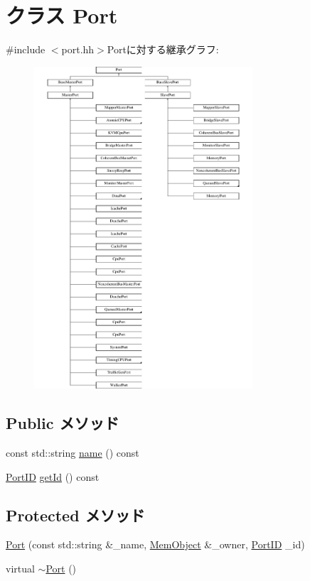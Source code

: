 \hypertarget{classPort}{
\section{クラス Port}
\label{classPort}
}


{\ttfamily \#include $<$port.hh$>$}Portに対する継承グラフ:\begin{figure}[H]
\begin{center}
\leavevmode
\includegraphics[height=12cm]{classPort}
\end{center}
\end{figure}
\subsection*{Public メソッド}
\begin{DoxyCompactItemize}
\item 
const std::string \hyperlink{classPort_a6490f765a824ced1cc94979609fe7e07}{name} () const 
\item 
\hyperlink{base_2types_8hh_acef4d7d41cb21fdc252e20c04cd7bb8e}{PortID} \hyperlink{classPort_ad95169ead4fa2bd3241b2bbb1bc7b420}{getId} () const 
\end{DoxyCompactItemize}
\subsection*{Protected メソッド}
\begin{DoxyCompactItemize}
\item 
\hyperlink{classPort_a569024a47504e9445c2030bd4b7f7b46}{Port} (const std::string \&\_\-name, \hyperlink{classMemObject}{MemObject} \&\_\-owner, \hyperlink{base_2types_8hh_acef4d7d41cb21fdc252e20c04cd7bb8e}{PortID} \_\-id)
\item 
virtual \hyperlink{classPort_ace19edfecfdf1557637d8d5bb9f91501}{$\sim$Port} ()
\end{DoxyCompactItemize}
